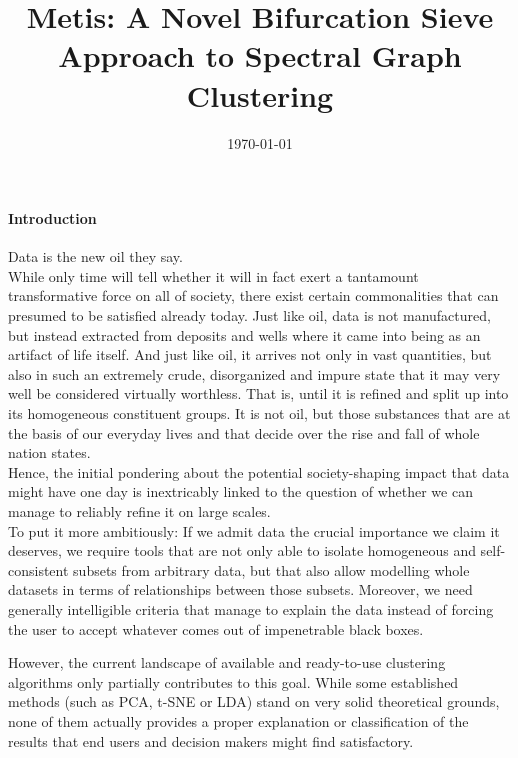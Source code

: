 \documentclass[10pt, a4paper, twocolumn]{article}
\title{Metis: A Novel Bifurcation Sieve Approach to Spectral Graph Clustering}
\author{
\authorstyle{Florian Schaefer}
}
\date{\today}
\begin{document}
    \maketitle
    \thispagestyle{firstpage}

    \paragraph{Introduction}
    Data is the new oil they say.
    \\
    While only time will tell whether it will in fact exert a tantamount transformative force on all of society, there exist
    certain commonalities that can presumed to be satisfied already today.
    Just like oil, data is not manufactured, but instead extracted from deposits and wells where it came into being as an
    artifact of life itself.
    And just like oil, it arrives not only in vast quantities, but also in such an extremely crude, disorganized and impure
    state that it may very well be considered virtually worthless.
    That is, until it is refined and split up into its homogeneous constituent groups.
    It is not oil, but those substances that are at the basis of our everyday lives and that decide over the rise and fall
    of whole nation states.
    \\
    Hence, the initial pondering about the potential society-shaping impact that data might have one day is inextricably
    linked to the question of whether we can manage to reliably refine it on large scales.
    \\
    To put it more ambitiously: If we admit data the crucial importance we claim it deserves, we require tools that are
    not only able to isolate homogeneous and self-consistent subsets from arbitrary data, but that also allow modelling
    whole datasets in terms of relationships between those subsets.
    Moreover, we need generally intelligible criteria that manage to explain the data instead of forcing the user to
    accept whatever comes out of impenetrable black boxes.

    However, the current landscape of available and ready-to-use clustering algorithms only partially contributes to this goal.
    While some established methods (such as PCA, t-SNE or LDA) stand on very solid theoretical grounds, none of them
    actually provides a proper explanation or classification of the results that end users and decision makers might
    find satisfactory.
\end{document}
